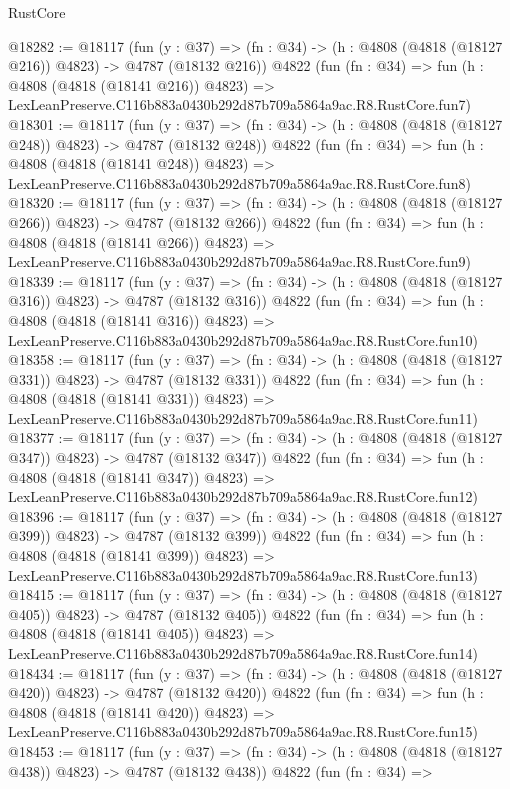 \begin{lexlean}{RustCore}
\begin{coremodule}
@18282 := @18117
    (fun (y : @37) => (fn : @34) -> (h : @4808 (@4818 (@18127 @216)) @4823) -> @4787 (@18132 @216))
    @4822
    (fun (fn : @34) =>
    fun (h : @4808 (@4818 (@18141 @216)) @4823) =>
    LexLeanPreserve.C116b883a0430b292d87b709a5864a9ac.R8.RustCore.fun7)
@18301 := @18117
    (fun (y : @37) => (fn : @34) -> (h : @4808 (@4818 (@18127 @248)) @4823) -> @4787 (@18132 @248))
    @4822
    (fun (fn : @34) =>
    fun (h : @4808 (@4818 (@18141 @248)) @4823) =>
    LexLeanPreserve.C116b883a0430b292d87b709a5864a9ac.R8.RustCore.fun8)
@18320 := @18117
    (fun (y : @37) => (fn : @34) -> (h : @4808 (@4818 (@18127 @266)) @4823) -> @4787 (@18132 @266))
    @4822
    (fun (fn : @34) =>
    fun (h : @4808 (@4818 (@18141 @266)) @4823) =>
    LexLeanPreserve.C116b883a0430b292d87b709a5864a9ac.R8.RustCore.fun9)
@18339 := @18117
    (fun (y : @37) => (fn : @34) -> (h : @4808 (@4818 (@18127 @316)) @4823) -> @4787 (@18132 @316))
    @4822
    (fun (fn : @34) =>
    fun (h : @4808 (@4818 (@18141 @316)) @4823) =>
    LexLeanPreserve.C116b883a0430b292d87b709a5864a9ac.R8.RustCore.fun10)
@18358 := @18117
    (fun (y : @37) => (fn : @34) -> (h : @4808 (@4818 (@18127 @331)) @4823) -> @4787 (@18132 @331))
    @4822
    (fun (fn : @34) =>
    fun (h : @4808 (@4818 (@18141 @331)) @4823) =>
    LexLeanPreserve.C116b883a0430b292d87b709a5864a9ac.R8.RustCore.fun11)
@18377 := @18117
    (fun (y : @37) => (fn : @34) -> (h : @4808 (@4818 (@18127 @347)) @4823) -> @4787 (@18132 @347))
    @4822
    (fun (fn : @34) =>
    fun (h : @4808 (@4818 (@18141 @347)) @4823) =>
    LexLeanPreserve.C116b883a0430b292d87b709a5864a9ac.R8.RustCore.fun12)
@18396 := @18117
    (fun (y : @37) => (fn : @34) -> (h : @4808 (@4818 (@18127 @399)) @4823) -> @4787 (@18132 @399))
    @4822
    (fun (fn : @34) =>
    fun (h : @4808 (@4818 (@18141 @399)) @4823) =>
    LexLeanPreserve.C116b883a0430b292d87b709a5864a9ac.R8.RustCore.fun13)
@18415 := @18117
    (fun (y : @37) => (fn : @34) -> (h : @4808 (@4818 (@18127 @405)) @4823) -> @4787 (@18132 @405))
    @4822
    (fun (fn : @34) =>
    fun (h : @4808 (@4818 (@18141 @405)) @4823) =>
    LexLeanPreserve.C116b883a0430b292d87b709a5864a9ac.R8.RustCore.fun14)
@18434 := @18117
    (fun (y : @37) => (fn : @34) -> (h : @4808 (@4818 (@18127 @420)) @4823) -> @4787 (@18132 @420))
    @4822
    (fun (fn : @34) =>
    fun (h : @4808 (@4818 (@18141 @420)) @4823) =>
    LexLeanPreserve.C116b883a0430b292d87b709a5864a9ac.R8.RustCore.fun15)
@18453 := @18117
    (fun (y : @37) => (fn : @34) -> (h : @4808 (@4818 (@18127 @438)) @4823) -> @4787 (@18132 @438))
    @4822
    (fun (fn : @34) =>

\end{coremodule}
\end{lexlean}
